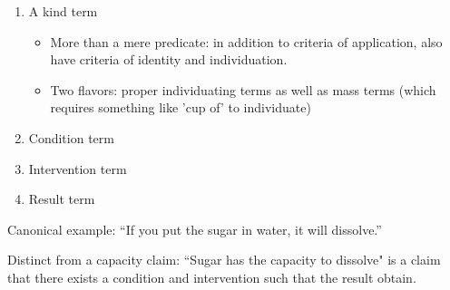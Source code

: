 \begin{enumerate}
\item A kind term
    \begin{itemize}
    \item More than a mere predicate: in addition to criteria of application, also have criteria of identity and individuation.
    \item Two flavors: proper individuating terms as well as mass terms (which requires something like 'cup of' to individuate)
    \end{itemize}
\item Condition term
\item Intervention term
\item Result term
\end{enumerate}

Canonical example: ``If you put the sugar in water, it will dissolve.''

Distinct from a capacity claim: ``Sugar has the capacity to dissolve" is a claim that there exists a condition and intervention such that the result obtain.